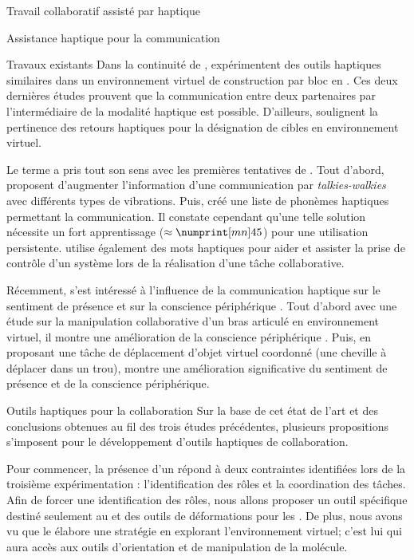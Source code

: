 \documentclass[myfrancais,ngerman,english,french]{mythesis}
\begin{document}
\begin{mychapter}{Travail collaboratif assisté par haptique}
\begin{mysection}{Assistance haptique pour la communication}
\begin{mysubsection}{Travaux existants}
				Dans la continuité de ,  expérimentent des outils haptiques similaires dans un environnement virtuel de construction par bloc en \myThreeD.
				Ces deux dernières études prouvent que la communication entre deux partenaires par l'intermédiaire de la modalité haptique est possible.
				D'ailleurs,  soulignent la pertinence des retours haptiques pour la désignation de cibles en environnement virtuel.

				Le terme  a pris tout son sens avec les premières tentatives de .
				Tout d'abord,  proposent d'augmenter l'information d'une communication par \textit{talkies-walkies} avec différents types de vibrations.
				Puis,  créé une liste de phonèmes haptiques permettant la communication.
				Il constate cependant qu'une telle solution nécessite un fort apprentissage ($\approx \mynum[mn]{45}$) pour une utilisation persistente.
				 utilise également des mots haptiques pour aider et assister la prise de contrôle d'un système lors de la réalisation d'une tâche collaborative.

				Récemment,  s'est intéressé à l'influence de la communication haptique sur le sentiment de présence et sur la conscience périphérique .
				Tout d'abord avec une étude sur la manipulation collaborative d'un bras articulé en environnement virtuel, il montre une amélioration de la conscience périphérique .
				Puis, en proposant une tâche de déplacement d'objet virtuel coordonné (une cheville à déplacer dans un trou),  montre une amélioration significative du sentiment de présence et de la conscience périphérique.
			\end{mysubsection}
			\begin{mysubsection}{Outils haptiques pour la collaboration}
				Sur la base de cet état de l'art et des conclusions obtenues au fil des trois études précédentes, plusieurs propositions s'imposent pour le développement d'outils haptiques de collaboration.

				Pour commencer, la présence d'un  répond à deux contraintes identifiées lors de la troisième expérimentation : l'identification des rôles et la coordination des tâches.
				Afin de forcer une identification des rôles, nous allons proposer un outil spécifique destiné seulement au  et des outils de déformations pour les .
				De plus, nous avons vu que le  élabore une stratégie en explorant l'environnement virtuel; c'est lui qui aura accès aux outils d'orientation et de manipulation de la molécule.


\end{mysubsection}
\end{mysection}
\end{mychapter}
\end{document}
